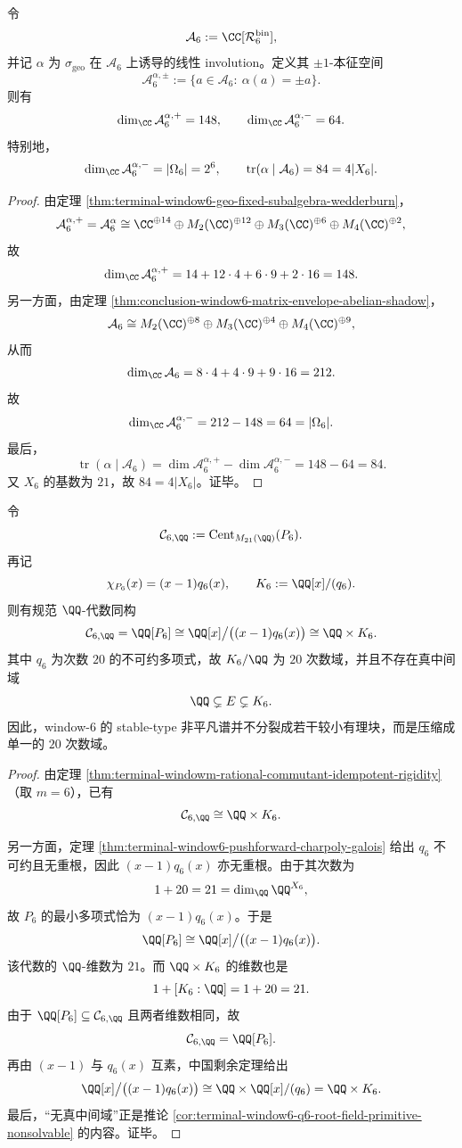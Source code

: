 \begin{theorem}\label{thm:conclusion-window6-groupoid-involution-lefschetz}
令
\[
\mathcal A_6:=\CC[\mathcal R_6^{\mathrm{bin}}],
\]
并记 \(\alpha\) 为 \(\sigma_{\mathrm{geo}}\) 在 \(\mathcal A_6\) 上诱导的线性 involution。定义其 \(\pm1\)-本征空间
\[
\mathcal A_6^{\alpha,\pm}:=\{a\in \mathcal A_6:\ \alpha(a)=\pm a\}.
\]
则有
\[
\dim_{\CC}\mathcal A_6^{\alpha,+}=148,
\qquad
\dim_{\CC}\mathcal A_6^{\alpha,-}=64.
\]
特别地，
\[
\dim_{\CC}\mathcal A_6^{\alpha,-}=|\Omega_6|=2^6,
\qquad
\operatorname{tr}(\alpha\mid \mathcal A_6)=84=4|X_6|.
\]
\end{theorem}
\begin{proof}
由定理 \ref{thm:terminal-window6-geo-fixed-subalgebra-wedderburn}，
\[
\mathcal A_6^{\alpha,+}
=
\mathcal A_6^\alpha
\cong
\CC^{\oplus 14}\oplus M_2(\CC)^{\oplus 12}\oplus M_3(\CC)^{\oplus 6}\oplus M_4(\CC)^{\oplus 2},
\]
故
\[
\dim_{\CC}\mathcal A_6^{\alpha,+}
=
14+12\cdot 4+6\cdot 9+2\cdot 16
=
148.
\]
另一方面，由定理 \ref{thm:conclusion-window6-matrix-envelope-abelian-shadow}，
\[
\mathcal A_6
\cong
M_2(\CC)^{\oplus 8}\oplus M_3(\CC)^{\oplus 4}\oplus M_4(\CC)^{\oplus 9},
\]
从而
\[
\dim_{\CC}\mathcal A_6
=
8\cdot 4+4\cdot 9+9\cdot 16
=
212.
\]
故
\[
\dim_{\CC}\mathcal A_6^{\alpha,-}
=
212-148
=
64
=
|\Omega_6|.
\]
最后，
\[
\operatorname{tr}(\alpha\mid \mathcal A_6)
=
\dim \mathcal A_6^{\alpha,+}-\dim \mathcal A_6^{\alpha,-}
=
148-64
=
84.
\]
又 \(X_6\) 的基数为 \(21\)，故 \(84=4|X_6|\)。证毕。
\end{proof}

\begin{theorem}\label{thm:conclusion-window6-stabletype-rational-etale-commutant}
令
\[
\mathcal C_{6,\QQ}
:=
\operatorname{Cent}_{M_{21}(\QQ)}(P_6).
\]
再记
\[
\chi_{P_6}(x)=(x-1)q_6(x),
\qquad
K_6:=\QQ[x]/(q_6).
\]
则有规范 \(\QQ\)-代数同构
\[
\mathcal C_{6,\QQ}
=
\QQ[P_6]
\cong
\QQ[x]\big/\bigl((x-1)q_6(x)\bigr)
\cong
\QQ\times K_6.
\]
其中 \(q_6\) 为次数 \(20\) 的不可约多项式，故 \(K_6/\QQ\) 为 \(20\) 次数域，并且不存在真中间域
\[
\QQ\subsetneq E\subsetneq K_6.
\]
因此，window-\(6\) 的 stable-type 非平凡谱并不分裂成若干较小有理块，而是压缩成单一的 \(20\) 次数域。
\end{theorem}
\begin{proof}
由定理 \ref{thm:terminal-windowm-rational-commutant-idempotent-rigidity}（取 \(m=6\)），已有
\[
\mathcal C_{6,\QQ}\cong \QQ\times K_6.
\]

另一方面，定理 \ref{thm:terminal-window6-pushforward-charpoly-galois} 给出 \(q_6\) 不可约且无重根，因此 \((x-1)q_6(x)\) 亦无重根。由于其次数为
\[
1+20=21=\dim_{\QQ}\QQ^{X_6},
\]
故 \(P_6\) 的最小多项式恰为 \((x-1)q_6(x)\)。于是
\[
\QQ[P_6]\cong \QQ[x]\big/\bigl((x-1)q_6(x)\bigr).
\]
该代数的 \(\QQ\)-维数为 \(21\)。而 \(\QQ\times K_6\) 的维数也是
\[
1+[K_6:\QQ]=1+20=21.
\]
由于 \(\QQ[P_6]\subseteq \mathcal C_{6,\QQ}\) 且两者维数相同，故
\[
\mathcal C_{6,\QQ}=\QQ[P_6].
\]
再由 \((x-1)\) 与 \(q_6(x)\) 互素，中国剩余定理给出
\[
\QQ[x]\big/\bigl((x-1)q_6(x)\bigr)\cong \QQ\times \QQ[x]/(q_6)=\QQ\times K_6.
\]
最后，“无真中间域”正是推论 \ref{cor:terminal-window6-q6-root-field-primitive-nonsolvable} 的内容。证毕。
\end{proof}

